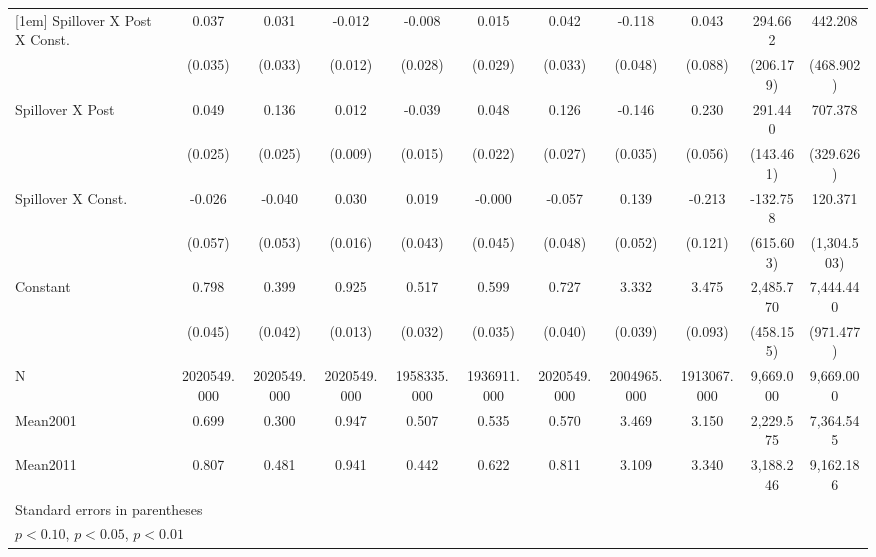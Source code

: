 {\begin{tabular}{l*{10}{c}}
[1em]
Spillover X Post X Const.&    0.037         &    0.031         &   -0.012         &   -0.008         &    0.015         &    0.042         &   -0.118\sym{**} &    0.043         &  294.662         &  442.208         \\
                &  (0.035)         &  (0.033)         &  (0.012)         &  (0.028)         &  (0.029)         &  (0.033)         &  (0.048)         &  (0.088)         &(206.179)         &(468.902)         \\
[1em]
Spillover X Post&    0.049\sym{*}  &    0.136\sym{***}&    0.012         &   -0.039\sym{**} &    0.048\sym{**} &    0.126\sym{***}&   -0.146\sym{***}&    0.230\sym{***}&  291.440\sym{**} &  707.378\sym{**} \\
                &  (0.025)         &  (0.025)         &  (0.009)         &  (0.015)         &  (0.022)         &  (0.027)         &  (0.035)         &  (0.056)         &(143.461)         &(329.626)         \\
[1em]
Spillover X Const.&   -0.026         &   -0.040         &    0.030\sym{*}  &    0.019         &   -0.000         &   -0.057         &    0.139\sym{***}&   -0.213\sym{*}  & -132.758         &  120.371         \\
                &  (0.057)         &  (0.053)         &  (0.016)         &  (0.043)         &  (0.045)         &  (0.048)         &  (0.052)         &  (0.121)         &(615.603)         &(1,304.503)         \\
[1em]
Constant        &    0.798\sym{***}&    0.399\sym{***}&    0.925\sym{***}&    0.517\sym{***}&    0.599\sym{***}&    0.727\sym{***}&    3.332\sym{***}&    3.475\sym{***}&2,485.770\sym{***}&7,444.440\sym{***}\\
                &  (0.045)         &  (0.042)         &  (0.013)         &  (0.032)         &  (0.035)         &  (0.040)         &  (0.039)         &  (0.093)         &(458.155)         &(971.477)         \\
\hline
N               &2020549.000         &2020549.000         &2020549.000         &1958335.000         &1936911.000         &2020549.000         &2004965.000         &1913067.000         &9,669.000         &9,669.000         \\
Mean2001        &    0.699         &    0.300         &    0.947         &    0.507         &    0.535         &    0.570         &    3.469         &    3.150         &2,229.575         &7,364.545         \\
Mean2011        &    0.807         &    0.481         &    0.941         &    0.442         &    0.622         &    0.811         &    3.109         &    3.340         &3,188.246         &9,162.186         \\
\hline\hline
\multicolumn{11}{l}{\footnotesize Standard errors in parentheses}\\
\multicolumn{11}{l}{\footnotesize \sym{*} \(p<0.10\), \sym{**} \(p<0.05\), \sym{***} \(p<0.01\)}\\
\end{tabular}
}
